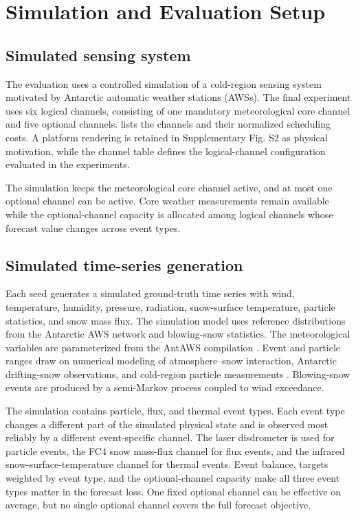 \section{Simulation and Evaluation Setup}
\label{sec:simulation_setup}

\subsection{Simulated sensing system}

The evaluation uses a controlled simulation of a cold-region sensing system motivated by
Antarctic automatic weather stations (AWSs). The final experiment uses six
logical channels, consisting of one mandatory meteorological core channel and five
optional channels.  lists the channels and their normalized
scheduling costs. A platform rendering is retained in Supplementary Fig. S2 as
physical motivation, while the channel table defines
the logical-channel configuration evaluated in the experiments.

The simulation keeps the meteorological core channel active, and at most one optional
channel can be active. Core weather measurements remain available while the
optional-channel capacity is allocated among logical channels whose
forecast value changes across event types.



\subsection{Simulated time-series generation}
\label{sec:simulator_construction}

Each seed generates a simulated ground-truth time series with wind, temperature,
humidity, pressure, radiation, snow-surface temperature, particle statistics, and
snow mass flux. The simulation model uses reference distributions from the Antarctic
AWS network and blowing-snow statistics. The meteorological variables are parameterized from the AntAWS
compilation \citep{AntAWS2023}. Event and particle ranges draw on numerical
modeling of atmosphere--snow interaction, Antarctic drifting-snow observations,
and cold-region particle measurements \citep{Amory2020,Sharma2023,Monrad2026}.
Blowing-snow events are produced by a semi-Markov process coupled to wind
exceedance.

The simulation contains particle, flux, and thermal event types. Each event type
changes a different part of the simulated physical state and is observed most
reliably by a different event-specific channel. The laser disdrometer is used for
particle events, the FC4 snow mass-flux channel for flux events, and the infrared
snow-surface-temperature channel for thermal events. Event balance, targets weighted by
event type, and the optional-channel capacity make all three event types matter
in the forecast loss. One fixed optional channel can be effective on average,
but no single optional channel covers the full
forecast objective.

